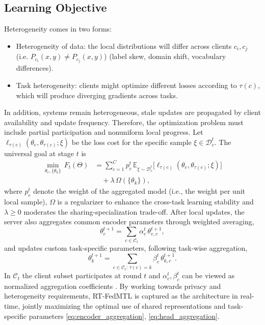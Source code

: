 \subsection{Learning Objective}  
Heterogeneity comes in two forms:  
\begin{itemize}  
\item Heterogeneity of data: the local distributions will differ across clients $c_i,c_j$ (i.e. $P_{c_i}(x,y)\neq P_{c_j}(x,y)$) (label skew, domain shift, vocabulary differences).  
\item Task heterogeneity: clients might optimize different losses according to $\tau(c)$, which will produce diverging gradients across tasks.  
\end{itemize}  
In addition, systems remain heterogeneous, stale updates are propagated by client availability and update frequency. Therefore, the optimization problem must include partial participation and nonuniform local progress. Let $\ell_{\tau(c)}(\theta_e,\theta_{\tau(c)};\xi)$ be the loss cost for the specific sample $\xi\in\mathcal{D}_c^t$. The universal goal at stage $t$ is  
\begin{equation}  \label{eq:universal_goal}
\begin{aligned}  
\min_{\theta_e,\{\theta_k\}} \,F_t(\Theta)  
&= \sum_{c=1}^{C} p_c^t \, \mathbb{E}_{\xi\sim\mathcal{D}_c^t}  
\big[\ell_{\tau(c)}(\theta_e,\theta_{\tau(c)};\xi)\big] \\  
&\quad + \lambda \, \Omega(\{\theta_k\}),  
\end{aligned}  
\end{equation}  
where $p_c^t$ denote the weight of the aggregated model (i.e., the weight per unit local sample), $\Omega$ is a regularizer to enhance the cross-task learning stability and $\lambda\ge0$ moderates the sharing-specialization trade-off. After local updates, the server also aggregates common encoder parameters through weighted averaging,  
\begin{equation}  \label{eq:encoder_aggregation}
\theta_e^{t+1} = \sum_{c\in\mathcal{C}_t} \alpha_c^t \, \theta_{e,c}^{t+1},  
\end{equation}  
and updates custom task-specific parameters, following task-wise aggregation,  
\begin{equation}  \label{eq:head_aggregation}
\theta_k^{t+1} = \sum_{c \in\mathcal{C}_t: \, \tau(c)=k} \beta_c^t \, \theta_{k,c}^{t+1}.  
\end{equation}  
In $\mathcal{C}_t$ the client subset participates at round $t$ and $\alpha_c^t,\beta_c^t$ can be viewed as normalized aggregation coefficients \cite{mcmahan2017communication,smith2017federated,zhou2025multi}. By working towards privacy and heterogeneity requirements, RT-FedMTL is captured as the architecture in real-time, jointly maximizing the optimal use of shared representations and task-specific parameters \eqref{eq:encoder_aggregation}, \eqref{eq:head_aggregation}.